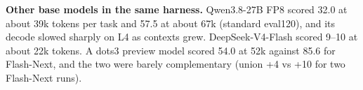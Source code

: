 \textbf{Other base models in the same harness.} Qwen3.8-27B FP8 scored 32.0 at about 39k tokens per task and 57.5 at about 67k (standard eval120), and its decode slowed sharply on L4 as contexts grew. DeepSeek-V4-Flash scored 9--10 at about 22k tokens. A dots3 preview model scored 54.0 at 52k against 85.6 for Flash-Next, and the two were barely complementary (union +4 vs +10 for two Flash-Next runs).
